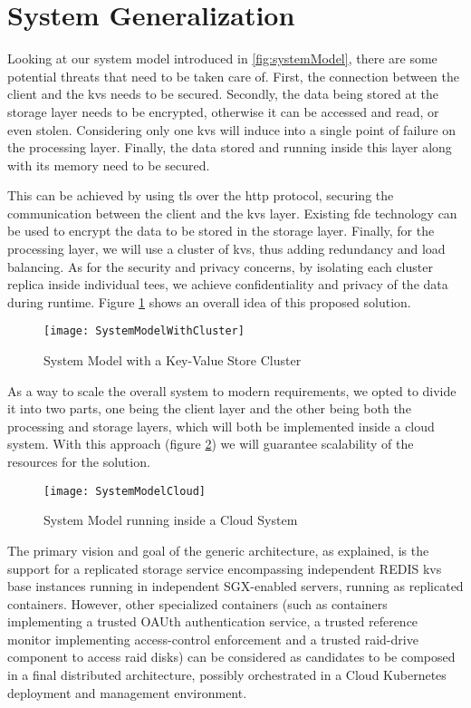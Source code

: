 
\section{System Generalization} %

Looking at our system model introduced in \ref{fig:systemModel}, there are some potential threats that need to be taken care of. First, the connection between the client and the \gls{kvs} needs to be secured. Secondly, the data being stored at the storage layer needs to be encrypted, otherwise it can be accessed and read, or even stolen. Considering only one \gls{kvs} will induce into a single point of failure on the processing layer. Finally, the data stored and running inside this layer along with its memory need to be secured. 

This can be achieved by using \gls{tls} over the \gls{http} protocol, securing the communication between the client and the \gls{kvs} layer.  Existing \gls{fde} technology can be used to encrypt the data to be stored in the storage layer. Finally, for the processing layer, we will use a cluster of \gls{kvs}, thus adding redundancy and load balancing. As for the security and privacy concerns, by isolating each cluster replica inside individual \gls{tee}s, we achieve confidentiality and privacy of the data during runtime. Figure \ref{fig:systemModelCluster} shows an overall idea of this proposed solution.

\begin{figure}[htbp]
	\centering
	{\texttt{[image: SystemModelWithCluster]}}
	\caption{System Model with a Key-Value Store Cluster}
	\label{fig:systemModelCluster}
\end{figure}

As a way to scale the overall system to modern requirements, we opted to divide it into two parts, one being the client layer and the other being both the processing and storage layers, which will both be implemented inside a cloud system. With this approach (figure \ref{fig:systemModelCloud}) we will guarantee scalability of the resources for the solution. 

\begin{figure}[htbp]
	\centering
	{\texttt{[image: SystemModelCloud]}}
	\caption{System Model running inside a Cloud System}
	\label{fig:systemModelCloud}
\end{figure}

The primary vision and goal of the generic architecture, as explained, is the support for a replicated storage service encompassing independent REDIS \gls{kvs} base instances running in independent SGX-enabled servers, running as replicated containers. However, other specialized containers (such as containers implementing a trusted OAUth authentication service, a trusted reference monitor implementing access-control enforcement and a trusted \gls{raid}-drive component to access \gls{raid} disks) can be considered as candidates to be composed in a final distributed architecture, possibly orchestrated in a Cloud Kubernetes deployment and management environment.

